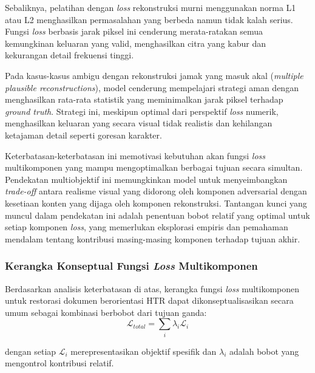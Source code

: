 Sebaliknya, pelatihan dengan \textit{loss} rekonstruksi murni menggunakan norma L1 atau L2 menghasilkan permasalahan yang berbeda namun tidak kalah serius. Fungsi \textit{loss} berbasis jarak piksel ini cenderung merata-ratakan semua kemungkinan keluaran yang valid, menghasilkan citra yang kabur dan kekurangan detail frekuensi tinggi.

Pada kasus-kasus ambigu dengan rekonstruksi jamak yang masuk akal (\textit{multiple plausible reconstructions}), model cenderung mempelajari strategi aman dengan menghasilkan rata-rata statistik yang meminimalkan jarak piksel terhadap \textit{ground truth}. Strategi ini, meskipun optimal dari perspektif \textit{loss} numerik, menghasilkan keluaran yang secara visual tidak realistis dan kehilangan ketajaman detail seperti goresan karakter.

Keterbatasan-keterbatasan ini memotivasi kebutuhan akan fungsi \textit{loss} multikomponen yang mampu mengoptimalkan berbagai tujuan secara simultan. Pendekatan multiobjektif ini memungkinkan model untuk menyeimbangkan \textit{trade-off} antara realisme visual yang didorong oleh komponen adversarial dengan kesetiaan konten yang dijaga oleh komponen rekonstruksi. Tantangan kunci yang muncul dalam pendekatan ini adalah penentuan bobot relatif yang optimal untuk setiap komponen \textit{loss}, yang memerlukan eksplorasi empiris dan pemahaman mendalam tentang kontribusi masing-masing komponen terhadap tujuan akhir.

\subsubsection{Kerangka Konseptual Fungsi \textit{Loss} Multikomponen}
\label{subsubsec:multi-component-loss}

Berdasarkan analisis keterbatasan di atas, kerangka fungsi \textit{loss} multikomponen untuk restorasi dokumen berorientasi HTR dapat dikonseptualisasikan secara umum sebagai kombinasi berbobot dari tujuan ganda:
\begin{equation}
      \mathcal{L}_{total} = \sum_{i} \lambda_i \mathcal{L}_i
\end{equation}

dengan setiap $\mathcal{L}_i$ merepresentasikan objektif spesifik dan $\lambda_i$ adalah bobot yang mengontrol kontribusi relatif.

